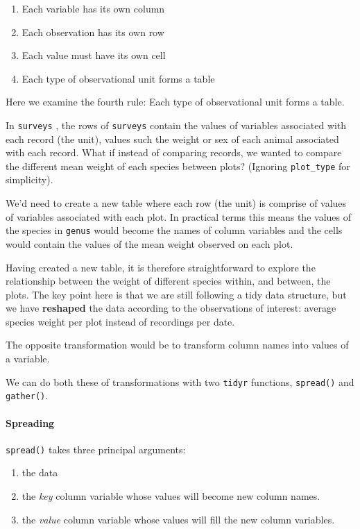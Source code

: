 \documentclass[]{article}
\providecommand{\tightlist}{%
  \setlength{\itemsep}{0pt}\setlength{\parskip}{0pt}}
\let\oldparagraph\paragraph
\renewcommand{\paragraph}[1]{\oldparagraph{#1}\mbox{}}
\begin{document}
\begin{enumerate}
\def\labelenumi{\arabic{enumi}.}
\tightlist
\item
  Each variable has its own column
\item
  Each observation has its own row
\item
  Each value must have its own cell
\item
  Each type of observational unit forms a table
\end{enumerate}

Here we examine the fourth rule: Each type of observational unit forms a
table.

In \texttt{surveys} , the rows of \texttt{surveys} contain the values of
variables associated with each record (the unit), values such the weight
or sex of each animal associated with each record. What if instead of
comparing records, we wanted to compare the different mean weight of
each species between plots? (Ignoring \texttt{plot\_type} for
simplicity).

We'd need to create a new table where each row (the unit) is comprise of
values of variables associated with each plot. In practical terms this
means the values of the species in \texttt{genus} would become the names
of column variables and the cells would contain the values of the mean
weight observed on each plot.

Having created a new table, it is therefore straightforward to explore
the relationship between the weight of different species within, and
between, the plots. The key point here is that we are still following a
tidy data structure, but we have \textbf{reshaped} the data according to
the observations of interest: average species weight per plot instead of
recordings per date.

The opposite transformation would be to transform column names into
values of a variable.

We can do both these of transformations with two \texttt{tidyr}
functions, \texttt{spread()} and \texttt{gather()}.

\paragraph{Spreading}\label{spreading}

\texttt{spread()} takes three principal arguments:

\begin{enumerate}
\def\labelenumi{\arabic{enumi}.}
\tightlist
\item
  the data
\item
  the \emph{key} column variable whose values will become new column
  names.\\
\item
  the \emph{value} column variable whose values will fill the new column
  variables.
\end{enumerate}
\end{document}
